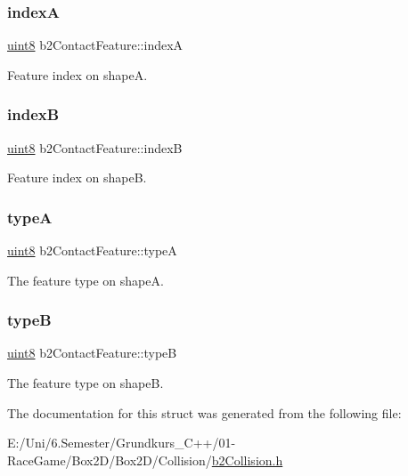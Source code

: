 \subsubsection{\texorpdfstring{indexA}{indexA}}
{\footnotesize\ttfamily \mbox{\hyperlink{b2_settings_8h_adde6aaee8457bee49c2a92621fe22b79}{uint8}} b2\+Contact\+Feature\+::indexA}



Feature index on shapeA. 

\mbox{\label{structb2_contact_feature_ad96712b6a0cc1f4b22b85b5948eab81d}} 
\subsubsection{\texorpdfstring{indexB}{indexB}}
{\footnotesize\ttfamily \mbox{\hyperlink{b2_settings_8h_adde6aaee8457bee49c2a92621fe22b79}{uint8}} b2\+Contact\+Feature\+::indexB}



Feature index on shapeB. 

\mbox{\label{structb2_contact_feature_a3361b651f0a88fb60ec6aba9f4921cc2}} 
\subsubsection{\texorpdfstring{typeA}{typeA}}
{\footnotesize\ttfamily \mbox{\hyperlink{b2_settings_8h_adde6aaee8457bee49c2a92621fe22b79}{uint8}} b2\+Contact\+Feature\+::typeA}



The feature type on shapeA. 

\mbox{\label{structb2_contact_feature_abb74afd6ee5b60834a3f8e2616182bdf}} 
\subsubsection{\texorpdfstring{typeB}{typeB}}
{\footnotesize\ttfamily \mbox{\hyperlink{b2_settings_8h_adde6aaee8457bee49c2a92621fe22b79}{uint8}} b2\+Contact\+Feature\+::typeB}



The feature type on shapeB. 



The documentation for this struct was generated from the following file\+:\begin{DoxyCompactItemize}
\item 
E\+:/\+Uni/6.\+Semester/\+Grundkurs\+\_\+\+C++/01-\/\+Race\+Game/\+Box2\+D/\+Box2\+D/\+Collision/\mbox{\hyperlink{b2_collision_8h}{b2\+Collision.\+h}}\end{DoxyCompactItemize}
